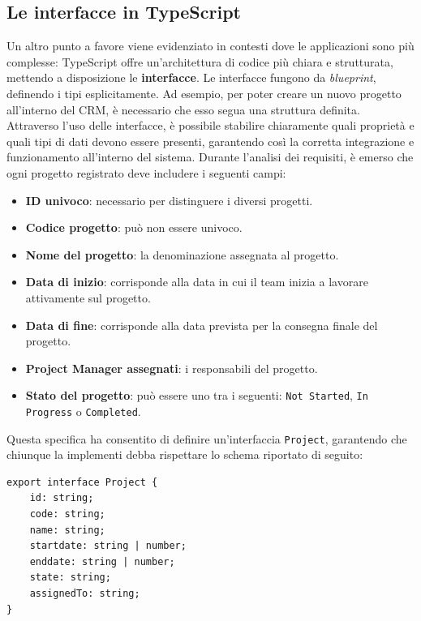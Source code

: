 \documentclass[target=bach,aauheader=,style=]{thud}
\begin{document}
\subsection{Le interfacce in TypeScript}
\noindent Un altro punto a favore viene evidenziato in contesti dove le applicazioni sono più complesse: TypeScript offre un'architettura di codice più chiara e strutturata, mettendo a disposizione le \textbf{interfacce}. Le interfacce fungono da \textit{blueprint}, definendo i tipi esplicitamente. Ad esempio, per poter creare un nuovo progetto all'interno del CRM, è necessario che esso segua una struttura definita. Attraverso l'uso delle interfacce, è possibile stabilire chiaramente quali proprietà e quali tipi di dati devono essere presenti, garantendo così la corretta integrazione e funzionamento all'interno del sistema. Durante l'analisi dei requisiti, è emerso che ogni progetto registrato deve includere i seguenti campi:

\begin{itemize}
    \item \textbf{ID univoco}: necessario per distinguere i diversi progetti.
    \item \textbf{Codice progetto}: può non essere univoco.
    \item \textbf{Nome del progetto}: la denominazione assegnata al progetto.
    \item \textbf{Data di inizio}: corrisponde alla data in cui il team inizia a lavorare attivamente sul progetto.
    \item \textbf{Data di fine}: corrisponde alla data prevista per la consegna finale del progetto.
    \item \textbf{Project Manager assegnati}: i responsabili del progetto.
    \item \textbf{Stato del progetto}: può essere uno tra i seguenti: \texttt{Not Started}, \texttt{In Progress} o \texttt{Completed}.
    
\end{itemize}

\noindent Questa specifica ha consentito di definire un'interfaccia \texttt{Project}, garantendo che chiunque la implementi debba rispettare lo schema riportato di seguito:

\begin{lstlisting}[language=React, caption=Interfaccia di progetto]
export interface Project {
    id: string;
    code: string;
    name: string;
    startdate: string | number;
    enddate: string | number;
    state: string;
    assignedTo: string;
}
\end{lstlisting}
\end{document}
